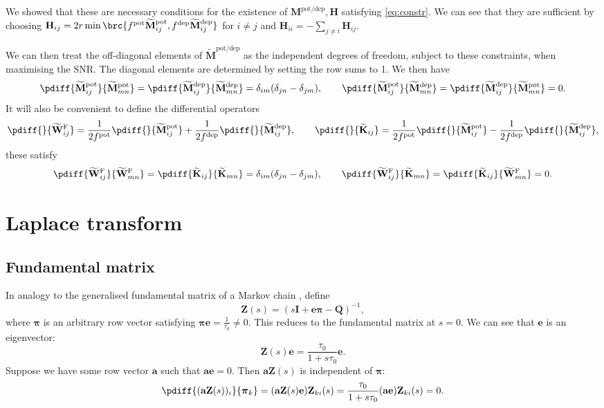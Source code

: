 \documentclass[12pt]{article}
\newcommand{\inv}{^{-1}}
\newcommand{\I}{\mathbf{I}}
\newcommand{\onev}{\mathbf{e}}
\newcommand{\MM}{\mathbf{Q}}
\newcommand{\fund}{\mathbf{Z}}
\newcommand{\pib}{\boldsymbol{\pi}}
\newcommand{\W}{\mathbf{W}}
\newcommand{\M}{\mathbf{M}}
\newcommand{\enc}{\mathbf{K}}
\newcommand{\pot}{^{\text{pot}}}
\newcommand{\dep}{^{\text{dep}}}
\newcommand{\potdep}{^{\text{pot/dep}}}
\renewcommand{\hom}{\mathbf{H}}
\newcommand{\Mh}{\widetilde{\M}}
\newcommand{\frgh}{\widetilde{\W}^{\mathrm{F}}}
\newcommand{\ench}{\widetilde{\enc}}
\begin{document}
We showed that these are necessary conditions for the existence of $\M\potdep,\hom$ satisfying \eqref{eq:constr}.
We can see that they are sufficient by choosing $\hom_{ij} = 2r\min\brc{f\pot\Mh\pot_{ij},f\dep\Mh\dep_{ij}}$ for $i \neq j$ and $\hom_{ii}=-\sum_{j \neq i} \hom_{ij}$.

We can then treat the off-diagonal elements of $\Mh\potdep$ as the independent degrees of freedom, subject to these constraints, when maximising the SNR.
The diagonal elements are determined by setting the row sums to 1.
We then have
%
\begin{equation}\label{eq:derivpd}
  \pdiff{\Mh\pot_{ij}}{\Mh\pot_{mn}{}} = \pdiff{\Mh\dep_{ij}}{\Mh\dep_{mn}{}} = \delta_{im}(\delta_{jn}-\delta_{jm}),
  \qquad
  \pdiff{\Mh\pot_{ij}}{\Mh\dep_{mn}{}} = \pdiff{\Mh\dep_{ij}}{\Mh\pot_{mn}{}} = 0.
\end{equation}
%
It will also be convenient to define the differential operators
%
\begin{equation}\label{eq:pertfe}
  \pdiff{}{\frgh_{ij}{}} = \frac{1}{2f\pot} \pdiff{}{\Mh\pot_{ij}{}} + \frac{1}{2f\dep} \pdiff{}{\Mh\dep_{ij}{}},
  \qquad
  \pdiff{}{\ench_{ij}{}} = \frac{1}{2f\pot} \pdiff{}{\Mh\pot_{ij}{}} - \frac{1}{2f\dep} \pdiff{}{\Mh\dep_{ij}{}},
\end{equation}
%
these satisfy
%
\begin{equation}\label{eq:derivfe}
  \pdiff{\frgh_{ij}}{\frgh_{mn}{}} = \pdiff{\ench_{ij}}{\ench_{mn}{}} = \delta_{im}(\delta_{jn}-\delta_{jm}),
  \qquad
  \pdiff{\frgh_{ij}}{\ench_{mn}{}} = \pdiff{\ench_{ij}}{\frgh_{mn}{}} = 0.
\end{equation}
%



\section{Laplace transform}\label{sec:laplace}

\subsection{Fundamental matrix \etc}\label{sec:lfund}

In analogy to the generalised fundamental matrix of a Markov chain \cite{Kemeny1981fund}, define
%
\begin{equation}\label{eq:lfund}
  \fund(s) = (s\I +\onev\pib -\MM)\inv,
\end{equation}
%
where $\pib$ is an arbitrary row vector satisfying $\pib\onev = \frac{1}{\tau_0} \neq 0$.
This reduces to the fundamental matrix at $s=0$.
We can see that $\onev$ is an eigenvector:
%
\begin{equation}\label{eq:lfundrowsum}
  \fund(s)\onev = \frac{\tau_0}{1+s\tau_0}\onev.
\end{equation}
%
Suppose we have some row vector $\mathbf{a}$ such that $\mathbf{a}\onev=0$.
Then $\mathbf{a}\fund(s)$ is independent of $\pib$:
%
\begin{equation}\label{eq:alfund}
  \pdiff{(\mathbf{a}\fund(s))_i}{\pib_k} = (\mathbf{a}\fund(s)\onev) \fund_{ki}(s)
      = \frac{\tau_0}{1+s\tau_0} (\mathbf{a}\onev) \fund_{ki}(s) = 0.
\end{equation}
%
\end{document}

